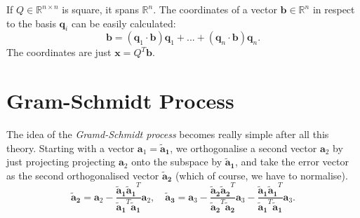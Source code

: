 \documentclass[a4paper, 11pt]{article}
\theoremstyle{plain}
\theoremstyle{definition}
\begin{document}
If $Q \in \mathbb R^{n \times n}$ is square, it spans $\mathbb R^n$. The coordinates of a vector $\mathbf b \in \mathbb R^n$ in respect to the basis $\mathbf q_i$ can be easily calculated:
\[
	\mathbf b =  (\mathbf q_1 \cdot \mathbf b)\mathbf q_1 + ... +  (\mathbf q_n \cdot \mathbf b)\mathbf q_n.
\]
The coordinates are just $\mathbf x = Q^T \mathbf b$.

\section{Gram-Schmidt Process}
The idea of the \emph{Gramd-Schmidt process} becomes really simple after all this theory. Starting with a vector $\mathbf a_1 = \mathbf{\tilde a_1}$, we orthogonalise a second vector $\mathbf a_2$ by just projecting projecting $\mathbf a_2$ onto the subspace by $\mathbf{\tilde a_1}$, and take the error vector as the second orthogonalised vector $\mathbf{\tilde a_2}$ (which of course, we have to normalise).
\[
	\mathbf{\tilde a_2} = \mathbf a_2 - \frac{\mathbf{\tilde a_1}\mathbf{\tilde a_1}^T}{\mathbf{\tilde a_1}^T\mathbf{\tilde a_1}} \mathbf a_2, \quad 
	\mathbf{\tilde a_3} = \mathbf a_3 - \frac{\mathbf{\tilde a_2}\mathbf{\tilde a_2}^T}{\mathbf{\tilde a_2}^T\mathbf{\tilde a_2}} \mathbf a_3 - \frac{\mathbf{\tilde a_1}\mathbf{\tilde a_1}^T}{\mathbf{\tilde a_1}^T\mathbf{\tilde a_1}} \mathbf a_3.
\]
\end{document}
